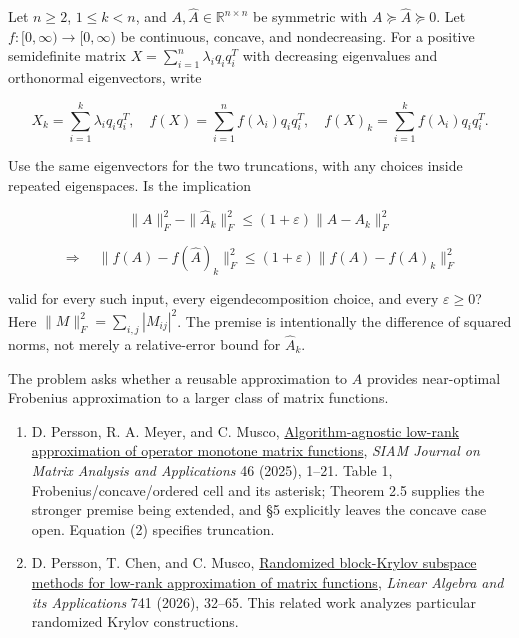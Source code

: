 \documentclass[11pt,a4paper]{article}
\makeatletter
\providecommand{\tightlist}{\setlength{\itemsep}{0pt}\setlength{\parskip}{0pt}}
\renewcommand{\subsection}{\Needspace{4\baselineskip}\@startsection{subsection}{2}{0pt}{9pt plus 1pt minus 1pt}{3pt}{\sffamily\bfseries\normalsize\color{ink}}}
\makeatother
\begin{document}
Let \(n\ge2\), \(1\le k<n\), and
\(A,\widehat A\in\mathbb R^{n\times n}\) be symmetric with
\(A\succeq\widehat A\succeq0\). Let \(f:[0,\infty)\to[0,\infty)\) be
continuous, concave, and nondecreasing. For a positive semidefinite
matrix \(X=\sum_{i=1}^n\lambda_iq_iq_i^T\) with decreasing eigenvalues
and orthonormal eigenvectors, write

\[
X_k=\sum_{i=1}^k\lambda_iq_iq_i^T,
\quad f(X)=\sum_{i=1}^nf(\lambda_i)q_iq_i^T,
\quad f(X)_k=\sum_{i=1}^kf(\lambda_i)q_iq_i^T.
\]

Use the same eigenvectors for the two truncations, with any choices
inside repeated eigenspaces. Is the implication

\[
\|A\|_F^2-\|\widehat A_k\|_F^2
\le(1+\varepsilon)\|A-A_k\|_F^2
\]

\[
\Longrightarrow\quad
\|f(A)-f(\widehat A)_k\|_F^2
\le(1+\varepsilon)\|f(A)-f(A)_k\|_F^2
\]

valid for every such input, every eigendecomposition choice, and every
\(\varepsilon\ge0\)? Here \(\|M\|_F^2=\sum_{i,j}|M_{ij}|^2\). The
premise is intentionally the difference of squared norms, not merely a
relative-error bound for \(\widehat A_k\).

The problem asks whether a reusable approximation to \(A\) provides
near-optimal Frobenius approximation to a larger class of matrix
functions.

\newpage
\subsection{References}\label{references}

\begin{enumerate}
\def\labelenumi{\arabic{enumi}.}
\tightlist
\item
  D. Persson, R. A. Meyer, and C. Musco,
  \href{https://arxiv.org/html/2311.14023v2}{Algorithm-agnostic low-rank
  approximation of operator monotone matrix functions}, \emph{SIAM
  Journal on Matrix Analysis and Applications} 46 (2025), 1--21. Table
  1, Frobenius/concave/ordered cell and its asterisk; Theorem 2.5
  supplies the stronger premise being extended, and §5 explicitly leaves
  the concave case open. Equation (2) specifies truncation.
\item
  D. Persson, T. Chen, and C. Musco,
  \href{https://arxiv.org/abs/2502.01888}{Randomized block-Krylov
  subspace methods for low-rank approximation of matrix functions},
  \emph{Linear Algebra and its Applications} 741 (2026), 32--65. This
  related work analyzes particular randomized Krylov constructions.
\end{enumerate}
\end{document}

